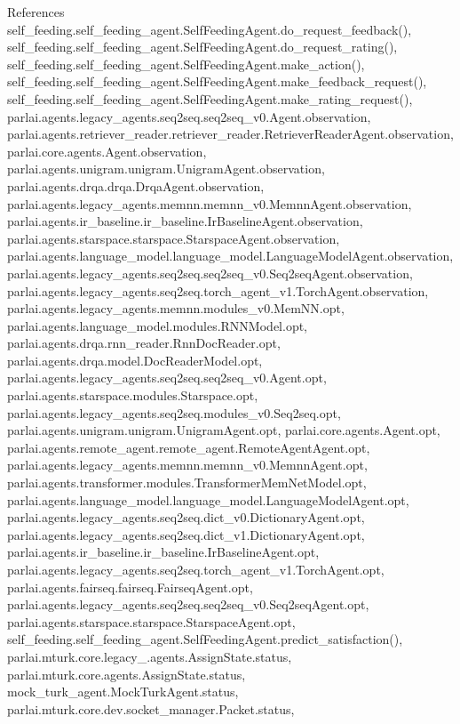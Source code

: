 References self\+\_\+feeding.\+self\+\_\+feeding\+\_\+agent.\+Self\+Feeding\+Agent.\+do\+\_\+request\+\_\+feedback(), self\+\_\+feeding.\+self\+\_\+feeding\+\_\+agent.\+Self\+Feeding\+Agent.\+do\+\_\+request\+\_\+rating(), self\+\_\+feeding.\+self\+\_\+feeding\+\_\+agent.\+Self\+Feeding\+Agent.\+make\+\_\+action(), self\+\_\+feeding.\+self\+\_\+feeding\+\_\+agent.\+Self\+Feeding\+Agent.\+make\+\_\+feedback\+\_\+request(), self\+\_\+feeding.\+self\+\_\+feeding\+\_\+agent.\+Self\+Feeding\+Agent.\+make\+\_\+rating\+\_\+request(), parlai.\+agents.\+legacy\+\_\+agents.\+seq2seq.\+seq2seq\+\_\+v0.\+Agent.\+observation, parlai.\+agents.\+retriever\+\_\+reader.\+retriever\+\_\+reader.\+Retriever\+Reader\+Agent.\+observation, parlai.\+core.\+agents.\+Agent.\+observation, parlai.\+agents.\+unigram.\+unigram.\+Unigram\+Agent.\+observation, parlai.\+agents.\+drqa.\+drqa.\+Drqa\+Agent.\+observation, parlai.\+agents.\+legacy\+\_\+agents.\+memnn.\+memnn\+\_\+v0.\+Memnn\+Agent.\+observation, parlai.\+agents.\+ir\+\_\+baseline.\+ir\+\_\+baseline.\+Ir\+Baseline\+Agent.\+observation, parlai.\+agents.\+starspace.\+starspace.\+Starspace\+Agent.\+observation, parlai.\+agents.\+language\+\_\+model.\+language\+\_\+model.\+Language\+Model\+Agent.\+observation, parlai.\+agents.\+legacy\+\_\+agents.\+seq2seq.\+seq2seq\+\_\+v0.\+Seq2seq\+Agent.\+observation, parlai.\+agents.\+legacy\+\_\+agents.\+seq2seq.\+torch\+\_\+agent\+\_\+v1.\+Torch\+Agent.\+observation, parlai.\+agents.\+legacy\+\_\+agents.\+memnn.\+modules\+\_\+v0.\+Mem\+N\+N.\+opt, parlai.\+agents.\+language\+\_\+model.\+modules.\+R\+N\+N\+Model.\+opt, parlai.\+agents.\+drqa.\+rnn\+\_\+reader.\+Rnn\+Doc\+Reader.\+opt, parlai.\+agents.\+drqa.\+model.\+Doc\+Reader\+Model.\+opt, parlai.\+agents.\+legacy\+\_\+agents.\+seq2seq.\+seq2seq\+\_\+v0.\+Agent.\+opt, parlai.\+agents.\+starspace.\+modules.\+Starspace.\+opt, parlai.\+agents.\+legacy\+\_\+agents.\+seq2seq.\+modules\+\_\+v0.\+Seq2seq.\+opt, parlai.\+agents.\+unigram.\+unigram.\+Unigram\+Agent.\+opt, parlai.\+core.\+agents.\+Agent.\+opt, parlai.\+agents.\+remote\+\_\+agent.\+remote\+\_\+agent.\+Remote\+Agent\+Agent.\+opt, parlai.\+agents.\+legacy\+\_\+agents.\+memnn.\+memnn\+\_\+v0.\+Memnn\+Agent.\+opt, parlai.\+agents.\+transformer.\+modules.\+Transformer\+Mem\+Net\+Model.\+opt, parlai.\+agents.\+language\+\_\+model.\+language\+\_\+model.\+Language\+Model\+Agent.\+opt, parlai.\+agents.\+legacy\+\_\+agents.\+seq2seq.\+dict\+\_\+v0.\+Dictionary\+Agent.\+opt, parlai.\+agents.\+legacy\+\_\+agents.\+seq2seq.\+dict\+\_\+v1.\+Dictionary\+Agent.\+opt, parlai.\+agents.\+ir\+\_\+baseline.\+ir\+\_\+baseline.\+Ir\+Baseline\+Agent.\+opt, parlai.\+agents.\+legacy\+\_\+agents.\+seq2seq.\+torch\+\_\+agent\+\_\+v1.\+Torch\+Agent.\+opt, parlai.\+agents.\+fairseq.\+fairseq.\+Fairseq\+Agent.\+opt, parlai.\+agents.\+legacy\+\_\+agents.\+seq2seq.\+seq2seq\+\_\+v0.\+Seq2seq\+Agent.\+opt, parlai.\+agents.\+starspace.\+starspace.\+Starspace\+Agent.\+opt, self\+\_\+feeding.\+self\+\_\+feeding\+\_\+agent.\+Self\+Feeding\+Agent.\+predict\+\_\+satisfaction(), parlai.\+mturk.\+core.\+legacy\+\_.\+agents.\+Assign\+State.\+status, parlai.\+mturk.\+core.\+agents.\+Assign\+State.\+status, mock\+\_\+turk\+\_\+agent.\+Mock\+Turk\+Agent.\+status, parlai.\+mturk.\+core.\+dev.\+socket\+\_\+manager.\+Packet.\+status, 